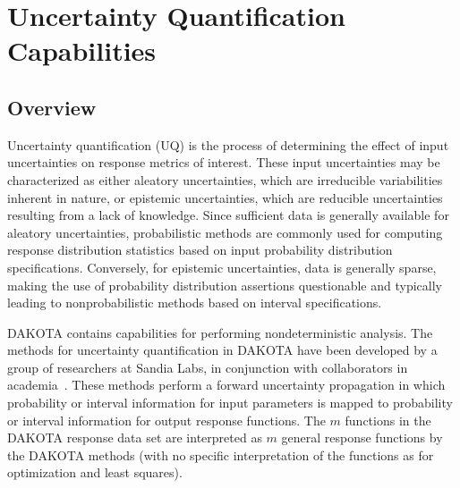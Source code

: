 \chapter{Uncertainty Quantification Capabilities}\label{uq}

\section{Overview}\label{uq:overview}

Uncertainty quantification (UQ) is the process of determining the
effect of input uncertainties on response metrics of interest.  These
input uncertainties may be characterized as either aleatory
uncertainties, which are irreducible variabilities inherent in nature,
or epistemic uncertainties, which are reducible uncertainties
resulting from a lack of knowledge.  Since sufficient data is
generally available for aleatory uncertainties, probabilistic methods
are commonly used for computing response distribution statistics based
on input probability distribution specifications.  Conversely, for
epistemic uncertainties, data is generally sparse, making the use of
probability distribution assertions questionable and typically leading
to nonprobabilistic methods based on interval specifications.

DAKOTA contains capabilities for performing nondeterministic analysis.  
The methods for uncertainty quantification in DAKOTA have been developed 
by a group of researchers at Sandia Labs, in conjunction with collaborators in
academia~\cite{Gha99,Gha91,Eld05,Tang10a}. 
These methods perform a forward uncertainty propagation in which
probability or interval information for input parameters is mapped to
probability or interval information for output response functions. The
$m$ functions in the DAKOTA response data set are interpreted as $m$
general response functions by the DAKOTA methods (with no specific
interpretation of the functions as for optimization and least squares).

